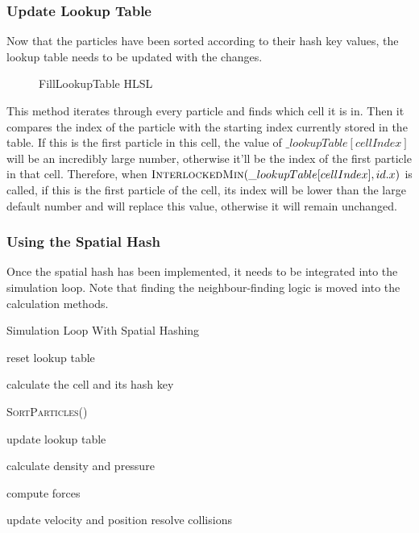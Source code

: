 \documentclass[a4paper, 12pt]{article}
\newcommand{\wideimage}[2][]{%
  \makebox[\textwidth][c]{\texttt{[image: \#2]}}%
}
\begin{document}
    \subsubsection{Update Lookup Table}

    Now that the particles have been sorted according to their hash key values, the lookup table needs to be updated with the changes.

    \begin{figure}[H]
        \begin{center}
            \wideimage[]{updateLookup.png}
            \caption{FillLookupTable HLSL}
        \end{center}
    \end{figure}

    This method iterates through every particle and finds which cell it is in. Then it compares the index of the particle with the starting index currently stored in the table. If this is the first particle in this cell, the value of $\_lookupTable[cellIndex]$ will be an incredibly large number, otherwise it'll be the index of the first particle in that cell. Therefore, when $\textsc{InterlockedMin}(\_lookupTable[cellIndex], id.x)$ is called, if this is the first particle of the cell, its index will be lower than the large default number and will replace this value, otherwise it will remain unchanged.

    \subsubsection{Using the Spatial Hash}

    Once the spatial hash has been implemented, it needs to be integrated into the simulation loop. Note that finding the neighbour-finding logic is moved into the calculation methods.

    \begin{algorithm}[H]
        \caption{Simulation Loop With Spatial Hashing}

        \begin{algorithmic}[1]

            \State reset lookup table

                \State calculate the cell and its hash key
            \EndFor

            \State \textsc{SortParticles}()
            
                \State update lookup table
            \EndFor

                \State calculate density and pressure
            \EndFor

                \State compute forces
            \EndFor

                \State update velocity and position
                \State resolve collisions
            \EndFor
        \end{algorithmic}

    \end{algorithm}
\end{document}
